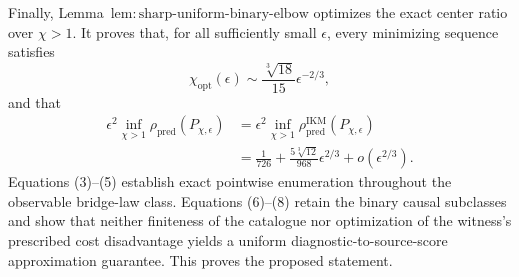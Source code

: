 Finally, Lemma~\(\mathrm{lem{:}sharp\text{-}uniform\text{-}binary\text{-}elbow}\) optimizes the exact center ratio over \(\chi>1\).  It proves that, for all sufficiently small \(\epsilon\), every minimizing sequence satisfies
\[
 \chi_{\mathrm{opt}}(\epsilon)
 \sim\frac{\sqrt[3]{18}}{15}\epsilon^{-2/3},
 \tag{7}
\]
and that
\[
\begin{aligned}
 \epsilon^2\inf_{\chi>1}\rho_{\mathrm{pred}}(P_{\chi,\epsilon})
 &=\epsilon^2\inf_{\chi>1}
   \rho_{\mathrm{pred}}^{\mathrm{IKM}}(P_{\chi,\epsilon})\\
 &=\frac1{726}
   +\frac{5\sqrt[3]{12}}{968}\epsilon^{2/3}
   +o(\epsilon^{2/3}).
 \tag{8}
\end{aligned}
\]
Equations (3)--(5) establish exact pointwise enumeration throughout the observable bridge-law class.  Equations (6)--(8) retain the binary causal subclasses and show that neither finiteness of the catalogue nor optimization of the witness's prescribed cost disadvantage yields a uniform diagnostic-to-source-score approximation guarantee.  This proves the proposed statement.